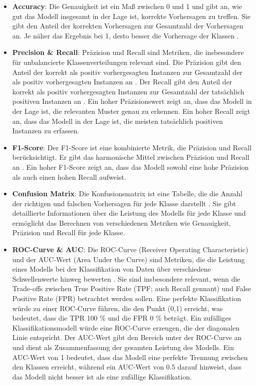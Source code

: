 \documentclass[conference]{IEEEtran}
\begin{document}
\begin{itemize}
    \item \textbf{Accuracy}: Die Genauigkeit ist ein Maß zwischen 0 und 1 und gibt an, wie gut das Modell insgesamt in der Lage ist, korrekte Vorhersagen zu treffen. Sie gibt den Anteil der korrekten Vorhersagen zur Gesamtzahl der Vorhersagen an. Je näher das Ergebnis bei 1, desto besser die Vorhersage der Klassen \cite{scikit_accuracy}.
    \item \textbf{Precision \& Recall}: Präzision und Recall sind Metriken, die insbesondere für unbalancierte Klassenverteilungen relevant sind. Die Präzision gibt den Anteil der korrekt als positiv vorhergesagten Instanzen zur Gesamtzahl der als positiv vorhergesagten Instanzen an \cite{scikit_pre}. Der Recall gibt den Anteil der korrekt als positiv vorhergesagten Instanzen zur Gesamtzahl der tatsächlich positiven Instanzen an \cite{scikit_recall}.
          Ein hoher Präzisionswert zeigt an, dass das Modell in der Lage ist, die relevanten Muster genau zu erkennen. Ein hoher Recall zeigt an, dass das Modell in der Lage ist, die meisten tatsächlich positiven Instanzen zu erfassen.
    \item \textbf{F1-Score}: Der F1-Score ist eine kombinierte Metrik, die Präzision und Recall berücksichtigt. Er gibt das harmonische Mittel zwischen Präzision und Recall an \cite{scikit_f1}. Ein hoher F1-Score zeigt an, dass das Modell sowohl eine hohe Präzision als auch einen hohen Recall aufweist.
    \item \textbf{Confusion Matrix}: Die Konfusionsmatrix ist eine Tabelle, die die Anzahl der richtigen und falschen Vorhersagen für jede Klasse darstellt \cite{scikit_conf}. Sie gibt detaillierte Informationen über die Leistung des Modells für jede Klasse und ermöglicht das Berechnen von verschiedenen Metriken wie Genauigkeit, Präzision und Recall für jede Klasse.
    \item \textbf{ROC-Curve \& AUC}: Die ROC-Curve (Receiver Operating Characteristic) und der AUC-Wert (Area Under the Curve) sind Metriken, die die Leistung eines Modells bei der Klassifikation von Daten über verschiedene Schwellenwerte hinweg bewerten \cite{scikit_roc}. Sie sind insbesondere relevant, wenn die Trade-offs zwischen True Positive Rate (TPF; auch Recall gennant) und False Positive Rate (FPR) betrachtet werden sollen.
          Eine perfekte Klassifikation würde zu einer ROC-Curve führen, die den Punkt (0,1) erreicht, was bedeutet, dass die TPR 100 \% und die FPR 0 \% beträgt. Ein zufälliges Klassifikationsmodell würde eine ROC-Curve erzeugen, die der diagonalen Linie entspricht. Der AUC-Wert gibt den Bereich unter der ROC-Curve an und dient als Zusammenfassung der gesamten Leistung des Modells. Ein AUC-Wert von 1 bedeutet, dass das Modell eine perfekte Trennung zwischen den Klassen erreicht, während ein AUC-Wert von 0.5 darauf hinweist, dass das Modell nicht besser ist als eine zufällige Klassifikation.
\end{itemize}
\end{document}
